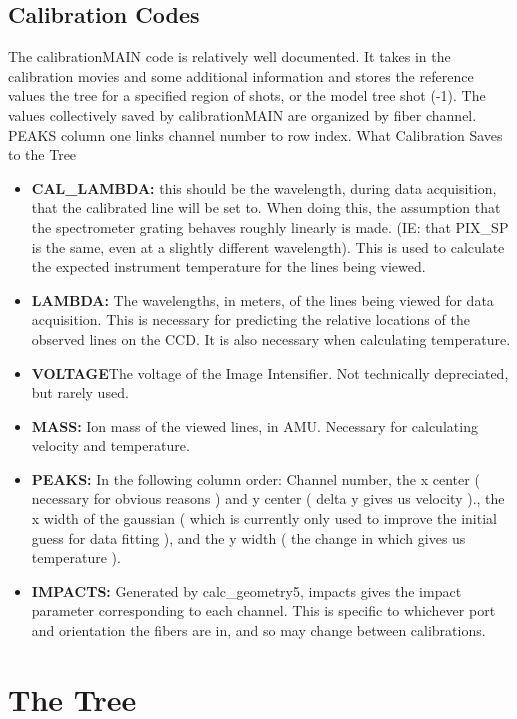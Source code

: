 \documentclass[twoside]{article}
\begin{document}
\subsection{Calibration Codes}
\hspace{4ex}The calibrationMAIN code is relatively well documented. It takes in the calibration movies and some additional information and stores the reference values the tree for a specified region of shots, or the model tree shot (-1). The values collectively saved by calibrationMAIN are organized by fiber channel. PEAKS column one links channel number to row index.
{What Calibration Saves to the Tree}
\begin{itemize}
\item\textbf{CAL\_LAMBDA:} this should be the wavelength, during data acquisition, that the calibrated line will be set to. When doing this, the assumption that the spectrometer grating behaves roughly linearly is made. (IE: that PIX\_SP is the same, even at a slightly different wavelength). This is used to calculate the expected instrument temperature for the lines being viewed. 
\item\textbf{LAMBDA:} The wavelengths, in meters, of the lines being viewed for data acquisition. This is necessary for predicting the relative locations of the observed lines on the CCD. It is also necessary when calculating temperature.
\item\textbf{VOLTAGE}The voltage of the Image Intensifier. Not technically depreciated, but rarely used.
\item\textbf{MASS:} Ion mass of the viewed lines, in AMU. Necessary for calculating velocity and temperature.
\item\textbf{PEAKS:} In the following column order: Channel number, the x center ( necessary for obvious reasons ) and y center ( delta y gives us velocity )., the x width of the gaussian ( which is currently only used to improve the initial guess for data fitting ), and the y width ( the change in which gives us temperature ).
\item\textbf{IMPACTS:} Generated by calc\_geometry5, impacts gives the impact parameter corresponding to each channel. This is specific to whichever port and orientation the fibers are in, and so may change between calibrations.
\end{itemize}

\section{The Tree}
\end{document}
